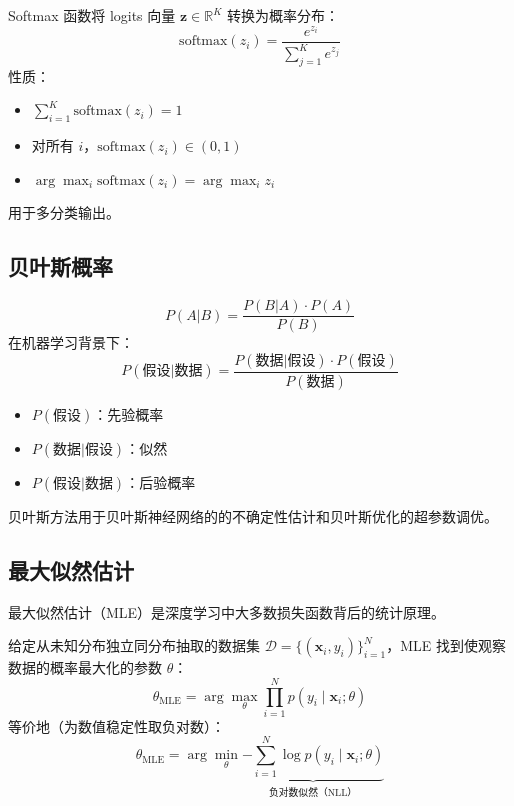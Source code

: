 \begin{示例}[Softmax 分布]
Softmax 函数将 logits 向量 $\mathbf{z} \in \mathbb{R}^K$ 转换为概率分布：
\begin{equation}
\text{softmax}(z_i) = \frac{e^{z_i}}{\sum_{j=1}^{K} e^{z_j}}
\end{equation}
性质：
\begin{itemize}
    \item $\sum_{i=1}^{K} \text{softmax}(z_i) = 1$
    \item 对所有 $i$，$\text{softmax}(z_i) \in (0, 1)$
    \item $\arg\max_i \text{softmax}(z_i) = \arg\max_i z_i$
\end{itemize}
用于多分类输出。
\end{示例}

\subsection{贝叶斯概率}

\begin{定义}[贝叶斯规则]
\begin{equation}
P(A|B) = \frac{P(B|A) \cdot P(A)}{P(B)}
\end{equation}
在机器学习背景下：
\begin{equation}
P(\text{假设}|\text{数据}) = \frac{P(\text{数据}|\text{假设}) \cdot P(\text{假设})}{P(\text{数据})}
\end{equation}
\begin{itemize}
    \item $P(\text{假设})$：先验概率
    \item $P(\text{数据}|\text{假设})$：似然
    \item $P(\text{假设}|\text{数据})$：后验概率
\end{itemize}
\end{定义}

贝叶斯方法用于贝叶斯神经网络的的不确定性估计和贝叶斯优化的超参数调优。

\subsection{最大似然估计}

最大似然估计（MLE）是深度学习中大多数损失函数背后的统计原理。

\begin{定义}[最大似然估计]
给定从未知分布独立同分布抽取的数据集 $\mathcal{D} = \{(\mathbf{x}_i, y_i)\}_{i=1}^{N}$，MLE 找到使观察数据的概率最大化的参数 $\theta$：
\begin{equation}
\theta_{\text{MLE}} = \arg\max_{\theta} \prod_{i=1}^{N} p(y_i \mid \mathbf{x}_i; \theta)
\end{equation}
等价地（为数值稳定性取负对数）：
\begin{equation}
\theta_{\text{MLE}} = \arg\min_{\theta} \underbrace{-\sum_{i=1}^{N} \log p(y_i \mid \mathbf{x}_i; \theta)}_{\text{负对数似然（NLL）}}
\end{equation}
\end{定义}

